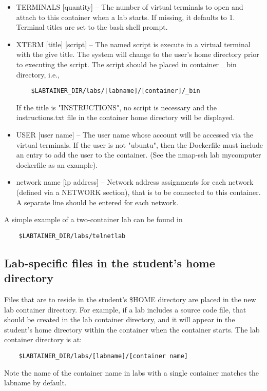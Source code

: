 \documentclass[12pt]{article}
\begin{document}
\begin{itemize}
\begin{itemize}
\item TERMINALS [quantity] -- The number of virtual terminals to open and attach to this 
container when a lab starts.  If missing, it defaults to 1. Terminal titles are set to the 
bash shell prompt.
\item XTERM [title] [script] -- The named script is execute in a virtual terminal with the
give title.   The system will change to the user's home directory prior to executing the
script.  The script should be placed in container \_bin directory, i.e.,
\begin{verbatim}
    $LABTAINER_DIR/labs/[labname]/[container]/_bin
\end{verbatim}
\noindent If the title is "INSTRUCTIONS", no script is necessary and the instructions.txt file
in the container home directory will be displayed.
\item USER [user name] -- The user name whose account will be accessed via the virtual terminals. If
the user is not "ubuntu", then the Dockerfile must include an entry to add the user to the container.
(See the nmap-ssh lab mycomputer dockerfile as an example).
\item network name [ip address] -- Network address assignments for each network (defined via a NETWORK section), 
that is to be connected to this container.  A separate line should be entered for each network.
\end{itemize}
\end{itemize}
  
A simple example of a two-container lab can be found in 
\begin{verbatim}
    $LABTAINER_DIR/labs/telnetlab
\end{verbatim}


\subsection {Lab-specific files in the student's home directory}
Files that are to reside in the student's \$HOME directory are placed in the 
new lab container directory.  For example, if a lab includes a source code file, that
should be created in the lab container directory, and it will appear in the student's
home directory within the container when the container starts.  The lab container
directory is at:  

\begin{verbatim}
    $LABTAINER_DIR/labs/[labname]/[container name]
\end{verbatim}
Note the name of the container name in labs with a single container matches the labname by default.
\end{document}
